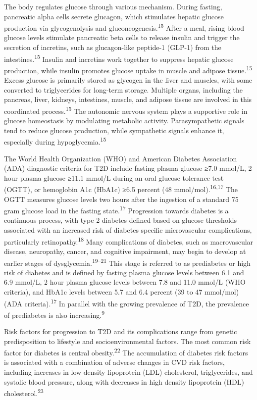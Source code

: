 \documentclass[
  letterpaper,
  headsepline=true,
  open=any]{scrbook}
\begin{document}
The body regulates glucose through various mechanism. During fasting,
pancreatic alpha cells secrete glucagon, which stimulates hepatic
glucose production via glycogenolysis and
gluconeogenesis.\textsuperscript{15} After a meal, rising blood glucose
levels stimulate pancreatic beta cells to release insulin and trigger
the secretion of incretins, such as glucagon-like peptide-1 (GLP-1) from
the intestines.\textsuperscript{15} Insulin and incretins work together
to suppress hepatic glucose production, while insulin promotes glucose
uptake in muscle and adipose tissue.\textsuperscript{15} Excess glucose
is primarily stored as glycogen in the liver and muscles, with some
converted to triglycerides for long-term storage. Multiple organs,
including the pancreas, liver, kidneys, intestines, muscle, and adipose
tissue are involved in this coordinated process.\textsuperscript{15} The
autonomic nervous system plays a supportive role in glucose homeostasis
by modulating metabolic activity. Parasympathetic signals tend to reduce
glucose production, while sympathetic signals enhance it, especially
during hypoglycemia.\textsuperscript{15}

The World Health Organization (WHO) and American Diabetes Association
(ADA) diagnostic criteria for T2D include fasting plasma glucose ≥7.0
mmol/L, 2 hour plasma glucose ≥11.1 mmol/L during an oral glucose
tolerance test (OGTT), or hemoglobin A1c (HbA1c) ≥6.5 percent (48
mmol/mol).\textsuperscript{16,17} The OGTT measures glucose levels two
hours after the ingestion of a standard 75 gram glucose load in the
fasting state.\textsuperscript{17} Progression towards diabetes is a
continuous process, with type 2 diabetes defined based on glucose
thresholds associated with an increased risk of diabetes specific
microvascular complications, particularly
retinopathy.\textsuperscript{18} Many complications of diabetes, such as
macrovascular disease, neuropathy, cancer, and cognitive impairment, may
begin to develop at earlier stages of
dysglycemia.\textsuperscript{19--21} This stage is referred to as
prediabetes or high risk of diabetes and is defined by fasting plasma
glucose levels between 6.1 and 6.9 mmol/L, 2 hour plasma glucose levels
between 7.8 and 11.0 mmol/L (WHO criteria), and HbA1c levels between 5.7
and 6.4 percent (39 to 47 mmol/mol) (ADA criteria).\textsuperscript{17}
In parallel with the growing prevalence of T2D, the prevalence of
prediabetes is also increasing.\textsuperscript{9}

Risk factors for progression to T2D and its complications range from
genetic predisposition to lifestyle and socioenvironmental factors. The
most common risk factor for diabetes is central
obesity.\textsuperscript{22} The accumulation of diabetes risk factors
is associated with a combination of adverse changes in CVD risk factors,
including increases in low density lipoprotein (LDL) cholesterol,
triglycerides, and systolic blood pressure, along with decreases in high
density lipoprotein (HDL) cholesterol.\textsuperscript{23}
\end{document}
